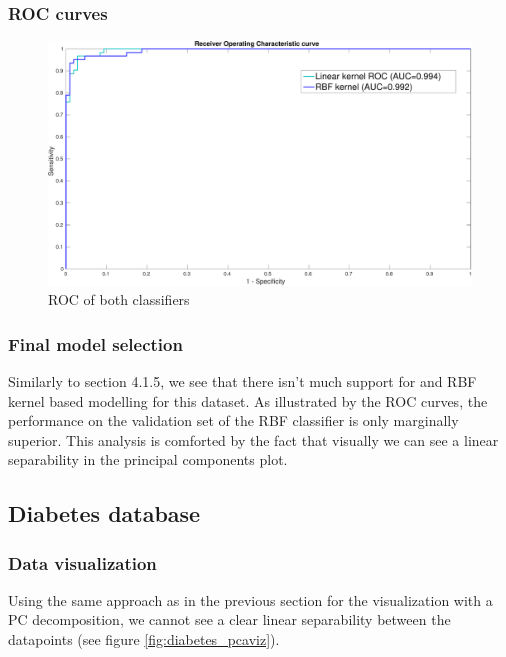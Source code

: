 \documentclass[11pt, a4paper]{article}
\begin{document}
\subsubsection{ROC curves}

\begin{figure}[H]
    \centering
    \includegraphics[scale=.40]{breast_ROC.pdf}
    \caption{ROC of both classifiers}
    \label{fig:breast_ROC}
\end{figure}

\subsubsection{Final model selection}

Similarly to section 4.1.5, we see that there isn't much support for
and RBF kernel based modelling for this dataset. As illustrated by the
ROC curves, the performance on the validation set of the RBF
classifier is only marginally superior. This analysis is comforted by
the fact that visually we can see a linear separability in the
principal components plot.

\subsection{Diabetes database}

\subsubsection{Data visualization}

Using the same approach as in the previous section for the
visualization with a PC decomposition, we cannot see a clear linear
separability between the datapoints (see figure
\ref{fig:diabetes_pcaviz}). 
\end{document}
